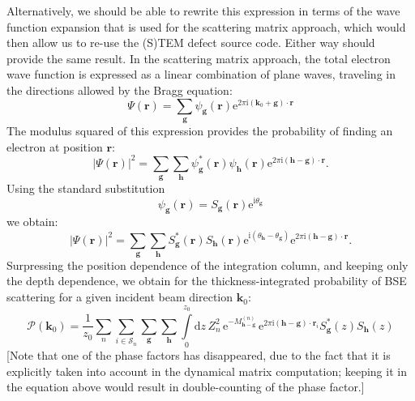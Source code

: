 \documentclass[DIV=calc, paper=letter, fontsize=11pt]{scrartcl}	 %
\begin{document}
Alternatively, we should be able to rewrite this expression in terms of the wave function expansion that is used for the 
scattering matrix approach, which would then allow us to re-use the (S)TEM defect source code.  Either way should provide 
the same result.  In the scattering matrix approach, the total electron wave function is expressed as a linear combination of
plane waves, traveling in the directions allowed by the Bragg equation:
\begin{equation}
	\Psi(\mathbf{r}) = \sum_{\mathbf{g}} \psi_{\mathbf{g}}(\mathbf{r}) \mathrm{e}^{2\pi\mathrm{i}(\mathbf{k}_0+\mathbf{g})\cdot\mathbf{r}}
\end{equation}
The modulus squared of this expression provides the probability of finding an electron at position $\mathbf{r}$:
\begin{equation}
	\vert\Psi(\mathbf{r})\vert^2 = \sum_{\mathbf{g}} \sum_{\mathbf{h}} \psi^{\ast}_{\mathbf{g}}(\mathbf{r}) \psi_{\mathbf{h}}(\mathbf{r})
	 \mathrm{e}^{2\pi\mathrm{i}(\mathbf{h}-\mathbf{g})\cdot\mathbf{r}}.
\end{equation}
Using the standard substitution
\[
	\psi_\mathbf{g}(\mathbf{r}) = S_{\mathbf{g}}(\mathbf{r}) \mathrm{e}^{\mathrm{i}\theta_{\mathbf{g}}}
\]
we obtain:
\begin{equation}
	\vert\Psi(\mathbf{r})\vert^2 = \sum_{\mathbf{g}} \sum_{\mathbf{h}} S^{\ast}_{\mathbf{g}}(\mathbf{r}) S_{\mathbf{h}}(\mathbf{r})
	\mathrm{e}^{\mathrm{i}(\theta_{\mathbf{h}}-\theta_{\mathbf{g}})}
	 \mathrm{e}^{2\pi\mathrm{i}(\mathbf{h}-\mathbf{g})\cdot\mathbf{r}}.
\end{equation}
Surpressing the position dependence of the integration column, and keeping only the depth dependence, we obtain
for the thickness-integrated probability of BSE scattering for a given incident beam direction $\mathbf{k}_0$:
\begin{equation}
	\mathcal{P}(\mathbf{k}_0) = \frac{1}{z_0}\sum_{n}\sum_{i\in\mathcal{S}_n}\sum_{\mathbf{g}}\sum_{\mathbf{h}} \int\limits_{0}^{z_{0}} \mathrm{d}z\,
	 Z^2_n\,\mathrm{e}^{-M^{(n)}_{\mathbf{h}-\mathbf{g}}}\,\mathrm{e}^{2\pi\mathrm{i} (\mathbf{h}-\mathbf{g})\cdot\mathbf{r}_{i}} 
	S^{\ast}_{\mathbf{g}}(z) S_{\mathbf{h}}(z)
    \label{eq:prob2}
\end{equation}
[Note that one of the phase factors has disappeared, due to the fact that it is explicitly taken into account in the 
dynamical matrix computation; keeping it in the equation above would result in double-counting of the phase factor.]
\end{document}
